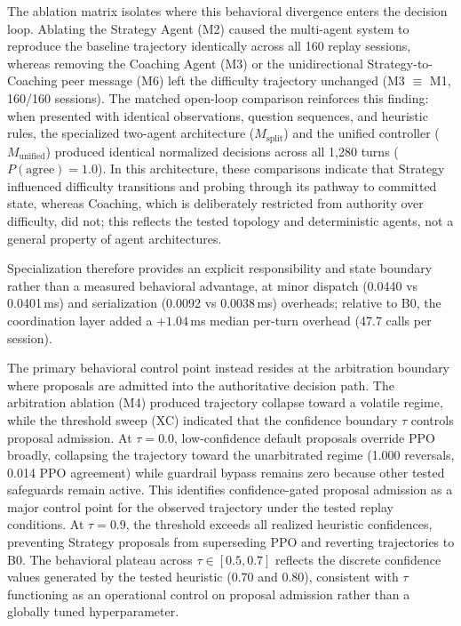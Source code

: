 \documentclass[runningheads]{llncs}
\begin{document}
The ablation matrix isolates where this behavioral divergence enters the decision loop. Ablating the Strategy Agent (M2) caused the multi-agent system to reproduce the baseline trajectory identically across all 160 replay sessions, whereas removing the Coaching Agent (M3) or the unidirectional Strategy-to-Coaching peer message (M6) left the difficulty trajectory unchanged (M3 $\equiv$ M1, 160/160 sessions). The matched open-loop comparison reinforces this finding: when presented with identical observations, question sequences, and heuristic rules, the specialized two-agent architecture ($M_{\mathrm{split}}$) and the unified controller ($M_{\mathrm{unified}}$) produced identical normalized decisions across all 1,280 turns ($P(\mathrm{agree})=1.0$). In this architecture, these comparisons indicate that Strategy influenced difficulty transitions and probing through its pathway to committed state, whereas Coaching, which is deliberately restricted from authority over difficulty, did not; this reflects the tested topology and deterministic agents, not a general property of agent architectures.

Specialization therefore provides an explicit responsibility and state boundary rather than a measured behavioral advantage, at minor dispatch (0.0440 vs 0.0401\,ms) and serialization (0.0092 vs 0.0038\,ms) overheads; relative to B0, the coordination layer added a $+1.04$\,ms median per-turn overhead (47.7 calls per session).

The primary behavioral control point instead resides at the arbitration boundary where proposals are admitted into the authoritative decision path. The arbitration ablation (M4) produced trajectory collapse toward a volatile regime, while the threshold sweep (XC) indicated that the confidence boundary $\tau$ controls proposal admission. At $\tau=0.0$, low-confidence default proposals override PPO broadly, collapsing the trajectory toward the unarbitrated regime (1.000 reversals, 0.014 PPO agreement) while guardrail bypass remains zero because other tested safeguards remain active. This identifies confidence-gated proposal admission as a major control point for the observed trajectory under the tested replay conditions. At $\tau=0.9$, the threshold exceeds all realized heuristic confidences, preventing Strategy proposals from superseding PPO and reverting trajectories to B0. The behavioral plateau across $\tau \in [0.5, 0.7]$ reflects the discrete confidence values generated by the tested heuristic (0.70 and 0.80), consistent with $\tau$ functioning as an operational control on proposal admission rather than a globally tuned hyperparameter.
\end{document}
